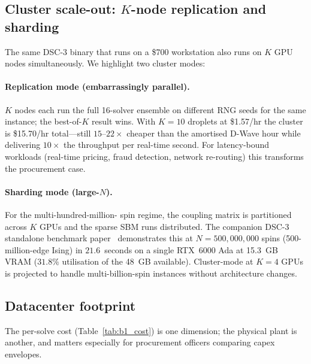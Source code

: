 \documentclass[11pt,a4paper]{article}
\begin{document}
\subsection{Cluster scale-out: $K$-node replication and sharding}
\label{sec:clustering}

The same DSC-3 binary that runs on a \$700 workstation also runs on $K$
GPU nodes simultaneously. We highlight two cluster modes:

\paragraph{Replication mode (embarrassingly parallel).} $K$ nodes each
run the full 16-solver ensemble on different RNG seeds for the same
instance; the best-of-$K$ result wins. With $K\!=\!10$ droplets at
\$1.57/hr the cluster is \$15.70/hr total---still $15$--$22\times$
cheaper than the amortised D-Wave hour while delivering $10\times$ the
throughput per real-time second. For latency-bound workloads
(real-time pricing, fraud detection, network re-routing) this
transforms the procurement case.

\paragraph{Sharding mode (large-$N$).} For the multi-hundred-million-
spin regime, the coupling matrix is partitioned across $K$ GPUs and
the sparse SBM runs distributed. The companion DSC-3 standalone
benchmark paper~\cite{daugherty_dsc3_benchmark} demonstrates this at
$N\!=\!500{,}000{,}000$ spins (500-million-edge Ising) in
$21.6$~seconds on a single RTX~6000 Ada at 15.3~GB VRAM
($31.8\%$ utilisation of the 48~GB available). Cluster-mode at
$K\!=\!4$ GPUs is projected to handle multi-billion-spin instances
without architecture changes.

\subsection{Datacenter footprint}
\label{sec:datacenter}

The per-solve cost (Table~\ref{tab:b1_cost}) is one dimension; the
physical plant is another, and matters especially for procurement
officers comparing capex envelopes.
\end{document}

